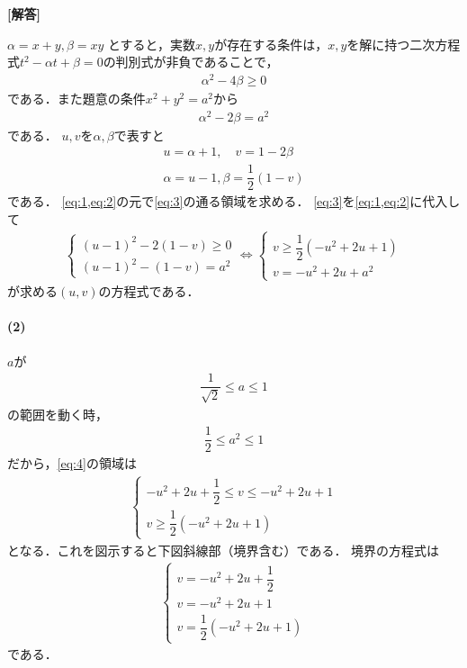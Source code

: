 \documentclass[../../main.tex]{subfiles}
\begin{document}
\begin{oframed}
  
\end{oframed}

{\bf [解答]}

$\alpha = x + y, \beta = xy$ とすると，実数$x, y$が存在する条件は，$x, y$を解に持つ二次方程式$t^2 -\alpha t + \beta = 0$の判別式が非負であることで，
\begin{align}
  \alpha^2 - 4\beta \ge 0 \label{eq:1}
\end{align}
である．また題意の条件$x^2+y^2=a^2$から
\begin{align}
  \alpha^2 - 2\beta = a^2 \label{eq:2}
\end{align}
である．
$u, v$を$\alpha,\beta$で表すと
\begin{align}
  u = \alpha + 1, \quad v = 1 - 2\beta \\
  \alpha = u - 1, \beta = \dfrac{1}{2}(1 - v) \label{eq:3}
\end{align}
である．
\cref{eq:1,eq:2}の元で\cref{eq:3}の通る領域を求める．
\cref{eq:3}を\cref{eq:1,eq:2}に代入して
\begin{align}
  \begin{cases}
    (u-1)^2 - 2(1-v) \ge 0 \\
    (u-1)^2 - (1-v) = a^2
  \end{cases}
  \iff
  \begin{cases}
    v \ge \dfrac{1}{2}(-u^2 + 2u + 1) \\
    v = -u^2 + 2u + a^2
  \end{cases} \label{eq:4}
\end{align}
が求める$(u,v)$の方程式である．

\paragraph{(2)}
$a$が
\begin{align}
  \dfrac{1}{\sqrt{2}} \le a \le 1
\end{align}
の範囲を動く時，
\begin{align}
  \dfrac{1}{2} \le a^2 \le 1
\end{align}
だから，\cref{eq:4}の領域は
\begin{align}
  \begin{cases}
    -u^2 + 2u + \dfrac{1}{2} \le v \le -u^2 + 2u + 1 \\
    v \ge \dfrac{1}{2}(-u^2 + 2u + 1)
  \end{cases} \label{eq:5}
\end{align}
となる．これを図示すると下図斜線部（境界含む）である．
境界の方程式は
\begin{align}
  \begin{cases}
    v = -u^2 + 2u + \dfrac{1}{2} \\
    v = -u^2 + 2u + 1 \\
    v = \dfrac{1}{2}(-u^2 + 2u + 1)
  \end{cases}
\end{align}
である．
\end{document}
